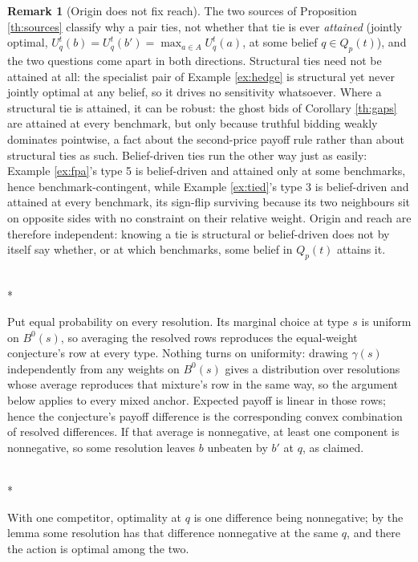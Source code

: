\documentclass[12pt]{article}
\makeatletter
\theoremstyle{definition}
\newtheorem{remark}{Remark}
\renewenvironment{proof}[1][\proofname]{\par
  \pushQED{\qed}%
  \normalfont \topsep6\p@\@plus6\p@\relax
  \trivlist
  \item[\hskip\labelsep\itshape #1\@addpunct{.}]\mbox{}\\*
  \ignorespaces
}{%
  \popQED\endtrivlist\@endpefalse
}
\makeatother
\begin{document}
\begin{remark}[Origin does not fix reach]\label{rem:originreach}
The two sources of Proposition \ref{th:sources} classify why a pair ties, not whether that tie is ever \emph{attained} (jointly optimal, $U^t_q(b) = U^t_q(b') = \max_{a \in A} U^t_q(a)$, at some belief $q \in Q_p(t)$), and the two questions come apart in both directions. Structural ties need not be attained at all: the specialist pair of Example \ref{ex:hedge} is structural yet never jointly optimal at any belief, so it drives no sensitivity whatsoever. Where a structural tie is attained, it can be robust: the ghost bids of Corollary \ref{th:gaps} are attained at every benchmark, but only because truthful bidding weakly dominates pointwise, a fact about the second-price payoff rule rather than about structural ties as such. Belief-driven ties run the other way just as easily: Example \ref{ex:fpa}'s type 5 is belief-driven and attained only at some benchmarks, hence benchmark-contingent, while Example \ref{ex:tied}'s type 3 is belief-driven and attained at every benchmark, its sign-flip surviving because its two neighbours sit on opposite sides with no constraint on their relative weight. Origin and reach are therefore independent: knowing a tie is structural or belief-driven does not by itself say whether, or at which benchmarks, some belief in $Q_p(t)$ attains it.
\end{remark}

\begin{proof}[Proof of Lemma \ref{lem:pairwise}]
Put equal probability on every resolution. Its marginal choice at type $s$ is uniform on $B^0(s)$, so averaging the resolved rows reproduces the equal-weight conjecture's row at every type. Nothing turns on uniformity: drawing $\gamma(s)$ independently from any weights on $B^0(s)$ gives a distribution over resolutions whose average reproduces that mixture's row in the same way, so the argument below applies to every mixed anchor. Expected payoff is linear in those rows; hence the conjecture's payoff difference is the corresponding convex combination of resolved differences. If that average is nonnegative, at least one component is nonnegative, so some resolution leaves $b$ unbeaten by $b'$ at $q$, as claimed.
\end{proof}

\begin{proof}[Proof of Corollary \ref{cor:binary}]
With one competitor, optimality at $q$ is one difference being nonnegative; by the lemma some resolution has that difference nonnegative at the same $q$, and there the action is optimal among the two.
\end{proof}
\end{document}
